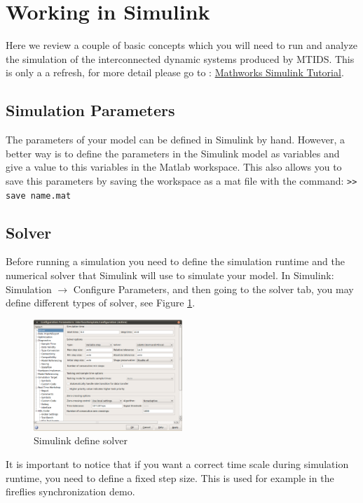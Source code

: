 \documentclass[a4paper,twoside, openright,12pt]{report}
\begin{document}
\section{Working in Simulink}\label{workinginsimulink}

Here we review a couple of basic concepts which you will need to run and analyze the simulation of the interconnected dynamic 
systems produced by MTIDS. This is only a a refresh, for more detail please go to : \href{http://www.mathworks.com/help/toolbox/simulink/simulink_product_page.html}{Mathworks Simulink Tutorial}.

\subsection{Simulation Parameters}
The parameters of your model can be defined in Simulink by hand. However, a better way is to 
define the parameters in the Simulink model as variables and give a value to this variables in the Matlab workspace. This also allows you to save this parameters
by saving the workspace as a mat file with the command: \texttt{>> save name.mat}

\subsection{Solver} \label{solver}
Before running a simulation you need to define the simulation runtime and the numerical solver that Simulink will use to simulate your model.
In Simulink: Simulation $\rightarrow$ Configure Parameters, and then going to the solver tab, you may define different types of solver, see Figure \ref{simulink1Fig}.

\begin{figure}[htb]
\centering
\includegraphics[width=0.5\textwidth]{pics/screenSim1.eps}
\caption[Simulink define solver]{Simulink define solver}
\label{simulink1Fig}
\end{figure} 

It is important to notice that if you want a correct time scale during simulation runtime, you need to define a fixed step size. This is used for example in the fireflies
synchronization demo.
\end{document}
